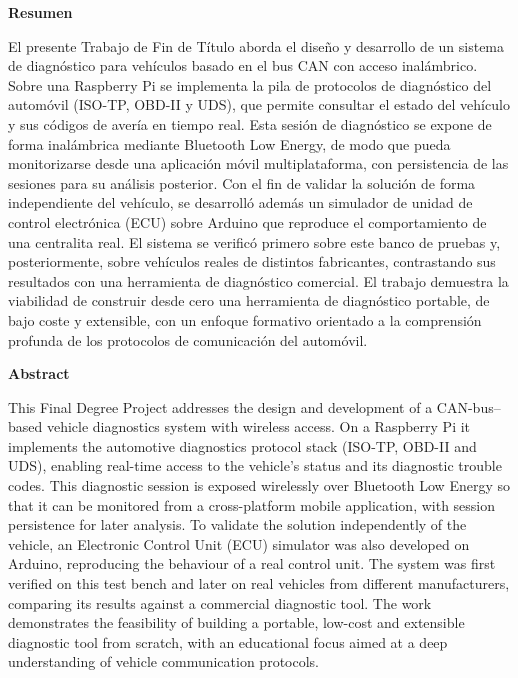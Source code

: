 {\setlength{\parskip}{8mm}
{\huge{\textbf{Resumen}}}

    {\large{El presente Trabajo de Fin de Título aborda el diseño y desarrollo de un sistema de diagnóstico para vehículos basado en el bus CAN con acceso inalámbrico. Sobre una Raspberry Pi se implementa la pila de protocolos de diagnóstico del automóvil (ISO-TP, OBD-II y UDS), que permite consultar el estado del vehículo y sus códigos de avería en tiempo real. Esta sesión de diagnóstico se expone de forma inalámbrica mediante Bluetooth Low Energy, de modo que pueda monitorizarse desde una aplicación móvil multiplataforma, con persistencia de las sesiones para su análisis posterior. Con el fin de validar la solución de forma independiente del vehículo, se desarrolló además un simulador de unidad de control electrónica (ECU) sobre Arduino que reproduce el comportamiento de una centralita real. El sistema se verificó primero sobre este banco de pruebas y, posteriormente, sobre vehículos reales de distintos fabricantes, contrastando sus resultados con una herramienta de diagnóstico comercial. El trabajo demuestra la viabilidad de construir desde cero una herramienta de diagnóstico portable, de bajo coste y extensible, con un enfoque formativo orientado a la comprensión profunda de los protocolos de comunicación del automóvil.}}

\newpage

{\huge{\textbf{Abstract}}}

    {\large{This Final Degree Project addresses the design and development of a CAN-bus--based vehicle diagnostics system with wireless access. On a Raspberry Pi it implements the automotive diagnostics protocol stack (ISO-TP, OBD-II and UDS), enabling real-time access to the vehicle's status and its diagnostic trouble codes. This diagnostic session is exposed wirelessly over Bluetooth Low Energy so that it can be monitored from a cross-platform mobile application, with session persistence for later analysis. To validate the solution independently of the vehicle, an Electronic Control Unit (ECU) simulator was also developed on Arduino, reproducing the behaviour of a real control unit. The system was first verified on this test bench and later on real vehicles from different manufacturers, comparing its results against a commercial diagnostic tool. The work demonstrates the feasibility of building a portable, low-cost and extensible diagnostic tool from scratch, with an educational focus aimed at a deep understanding of vehicle communication protocols.}

}}
